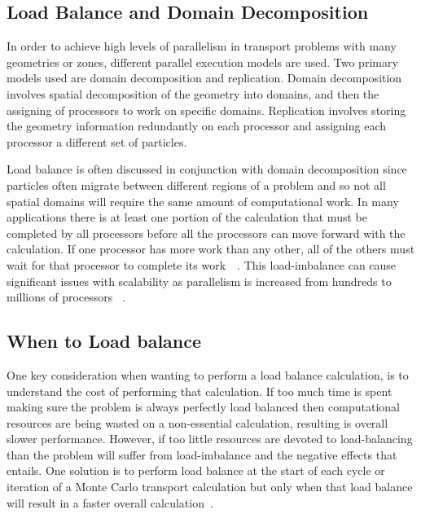 \subsection{ \textbf{ Load Balance and Domain Decomposition} }

In order to achieve high levels of parallelism in transport problems with many geometries or zones, different parallel execution models are used.
%
Two primary models used are domain decomposition and replication.
%
Domain decomposition involves spatial decomposition of the geometry into domains, and then the assigning of processors to work on specific domains.
%
Replication involves storing the geometry information redundantly on each processor and assigning each processor a different set of particles.
~\cite{procassini2005load}
~\cite{o2005dynamic}


Load balance is often discussed in conjunction with domain decomposition since particles often migrate between different regions of a problem and so not all spatial domains will require the same amount of computational work.
%
In many applications there is at least one portion of the calculation that must be completed by all processors before all the processors can move forward with the calculation.
%
If one processor has more work than any other, all of the others must wait for that processor to complete its work~\cite{procassini2005load}~\cite{o2005dynamic}.
%
This load-imbalance can cause significant issues with scalability as parallelism is increased from hundreds to millions of processors ~\cite{o2013scalable}.
%

\subsection*{When to Load balance}

%
One key consideration when wanting to perform a load balance calculation, is to understand the cost of performing that calculation.
%
If too much time is spent making sure the problem is always perfectly load balanced then computational resources are being wasted on a non-essential calculation, resulting is overall slower performance.
%
However, if too little resources are devoted to load-balancing than the problem will suffer from load-imbalance and the negative effects that entails.
%
One solution is to perform load balance at the start of each cycle or iteration of a Monte Carlo transport calculation but only when that load balance will result in a faster overall calculation~\cite{o2005dynamic}.
%


